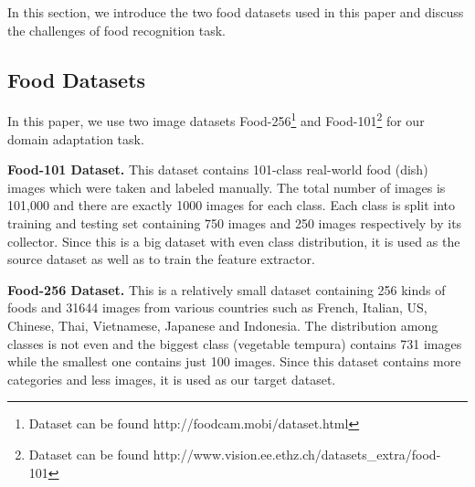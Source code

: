 In this section, we introduce the two food datasets used in this paper and discuss the challenges of food recognition task.
\subsection{Food Datasets}
 In this paper, we use two image datasets Food-256\footnote{Dataset can be found http://foodcam.mobi/dataset.html} \cite{kawano14c} and Food-101\footnote{Dataset can be found http://www.vision.ee.ethz.ch/datasets\_extra/food-101} \cite{bossard14} for our domain adaptation task.

\textbf{Food-101 Dataset.}
This dataset contains 101-class real-world food (dish) images which were taken and labeled manually. The total number of images is 101,000 and there are exactly 1000 images for each class. Each class is split into training and testing set containing 750 images and 250 images respectively by its collector. Since this is a big dataset with even class distribution, it is used as the source dataset as well as to train the feature extractor.

\textbf{Food-256 Dataset.}
This is a relatively small dataset containing 256 kinds of foods and 31644 images from various countries such as French, Italian, US, Chinese, Thai, Vietnamese, Japanese and Indonesia. The distribution among classes is not even and the biggest class (vegetable tempura) contains 731 images while the smallest one contains just 100 images. Since this dataset contains more categories and less images, it is used as our target dataset.

